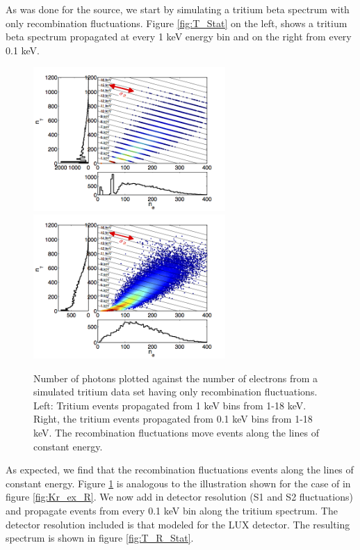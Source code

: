As was done for the \KrCal source, we start by simulating a tritium beta spectrum with only recombination fluctuations. Figure \ref{fig:T_Stat} on the left, shows a tritium beta spectrum propagated at every 1 keV energy bin and on the right from every 0.1 keV. 
\renewcommand{\baselinestretch}{1}
\small\normalsize
\begin{figure}[h!]\centering
\includegraphics[width=73mm]{Chapter_Flucs/Figures/EX_Plots/EX_T_R_1keV.png}
\includegraphics[width=73mm]{Chapter_Flucs/Figures/EX_Plots/EX_T_R_only.png}
\caption{Number of photons plotted against the number of electrons from a simulated tritium data set having only recombination fluctuations. Left: Tritium events propagated from 1 keV bins from 1-18 keV. Right, the tritium events propagated from 0.1 keV bins from 1-18 keV. The recombination fluctuations move events along the lines of constant energy.}
\label{fig:T_R}
\end{figure}
\renewcommand{\baselinestretch}{2}
\small\normalsize

As expected, we find that the recombination fluctuations events along the lines of constant energy. Figure \ref{fig:T_R} is analogous to the illustration shown for the case of \KrCal in figure \ref{fig:Kr_ex_R}. We now add in detector resolution (S1 and S2 fluctuations) and propagate events from every 0.1 keV bin along the tritium spectrum. The detector resolution included is that modeled for the LUX detector. The resulting spectrum is shown in figure \ref{fig:T_R_Stat}.


